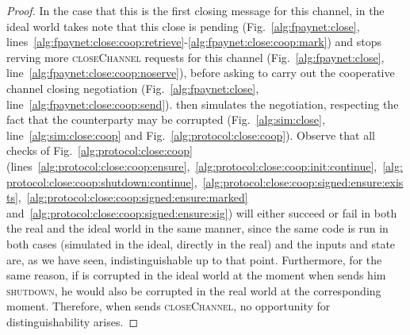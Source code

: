 \begin{proof}
  In the case that this is the first closing message for this channel, in the
  ideal world \fpaynet{} takes note that this close is pending
  (Fig.~\ref{alg:fpaynet:close},
  lines~\ref{alg:fpaynet:close:coop:retrieve}-\ref{alg:fpaynet:close:coop:mark})
  and stops rerving more \textsc{closeChannel} requests for this channel
  (Fig.~\ref{alg:fpaynet:close}, line~\ref{alg:fpaynet:close:coop:noserve}),
  before asking \simulator{} to carry out the cooperative channel closing
  negotiation (Fig.~\ref{alg:fpaynet:close},
  line~\ref{alg:fpaynet:close:coop:send}). \simulator{} then simulates the
  negotiation, respecting the fact that the counterparty may be corrupted
  (Fig.~\ref{alg:sim:close}, line~\ref{alg:sim:close:coop} and
  Fig.~\ref{alg:protocol:close:coop}). Observe that all checks of
  Fig.~\ref{alg:protocol:close:coop}
  (lines~\ref{alg:protocol:close:coop:ensure},~\ref{alg:protocol:close:coop:init:continue},~\ref{alg:protocol:close:coop:shutdown:continue},~\ref{alg:protocol:close:coop:signed:ensure:exists},~\ref{alg:protocol:close:coop:signed:ensure:marked}
  and~\ref{alg:protocol:close:coop:signed:ensure:sig}) will either succeed or
  fail in both the real and the ideal world in the same manner, since the same
  code is run in both cases (simulated in the ideal, directly in the real) and
  the inputs and state are, as we have seen, indistinguishable up to that point.
  Furthermore, for the same reason, if \bob{} is corrupted in the ideal world at
  the moment when \alice{} sends him \textsc{shutdown}, he would also be
  corrupted in the real world at the corresponding moment. Therefore, when
  \environment{} sends \textsc{closeChannel}, no opportunity for
  distinguishability arises.


\end{proof}
